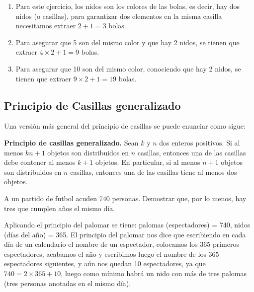 \begin{solucion} \hfill
    \renewcommand{\labelenumi}{\alph{enumi})}
    \begin{enumerate}
        \item Para este ejercicio, los nidos son los colores de las bolas, es decir, hay dos nidos (o casillas), para garantizar dos elementos en la misma casilla necesitamos extraer $2+1=3$ bolas.
        \item Para asegurar que 5 son del mismo color y que hay 2 nidos, se tienen que extraer $4 \times 2+1=9$ bolas.
        \item Para asegurar que 10 son del mismo color, conociendo que hay 2 nidos, se tienen que extraer $9 \times 2+1=19$ bolas.
    \end{enumerate}
    
\end{solucion}

\subsection{Principio de Casillas generalizado}

Una versión más general del principio de casillas se puede enunciar como sigue:

\begin{teorema}
    \textbf{Principio de casillas generalizado.} Sean $k$ y $n$ dos enteros positivos.  Si al menos $kn+1$ objetos son distribuidos en $n$ casillas, entonces una de las casillas debe contener al menos $k+1$ objetos.  En particular, si al menos $n+1$ objetos son distribuidos en $n$ casillas, entonces una de las casillas tiene al menos dos objetos.
\end{teorema}

\begin{ejemplo}
    A un partido de futbol acuden 740 personas. Demostrar que, por lo menos, hay tres que cumplen años el mismo día.
\end{ejemplo}

\begin{solucion}
    Aplicando el principio del palomar se tiene:
    palomas (espectadores) = 740,
    nidos (días del año) = 365.
    El principio del palomar nos dice que escribiendo en cada día de un calendario el nombre de un espectador, colocamos los 365 primeros espectadores, acabamos el año y escribimos luego el nombre de los 365 espectadores siguientes, y aún nos quedan 10 espectadores, ya que $740=2 \times 365+10$, luego como mínimo habrá un nido con más de tres palomas (tres personas anotadas en el mismo día).
\end{solucion}

